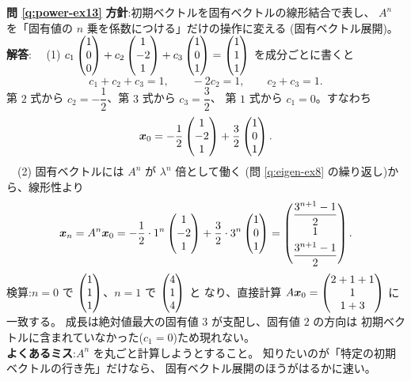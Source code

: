 \bigskip
\noindent\textbf{問 \ref{q:power-ex13}}\quad
\textbf{方針}:初期ベクトルを固有ベクトルの線形結合で表し、
$A^n$ を「固有値の $n$ 乗を係数につける」だけの操作に変える
(固有ベクトル展開)。\\
\textbf{解答}:
　(1) $c_1\begin{pmatrix}1 \\ 0 \\ 0\end{pmatrix} + c_2\begin{pmatrix}1 \\ -2 \\ 1\end{pmatrix}
+ c_3\begin{pmatrix}1 \\ 0 \\ 1\end{pmatrix} = \begin{pmatrix}1 \\ 1 \\ 1\end{pmatrix}$ を成分ごとに書くと
\[
c_1 + c_2 + c_3 = 1, \qquad -2c_2 = 1, \qquad c_2 + c_3 = 1.
\]
第 $2$ 式から $c_2 = -\dfrac{1}{2}$、第 $3$ 式から $c_3 = \dfrac{3}{2}$、
第 $1$ 式から $c_1 = 0$。すなわち
\[
\bm{x}_0 = -\frac{1}{2}\begin{pmatrix}1 \\ -2 \\ 1\end{pmatrix} + \frac{3}{2}\begin{pmatrix}1 \\ 0 \\ 1\end{pmatrix}.
\]
　(2) 固有ベクトルには $A^n$ が $\lambda^n$ 倍として働く
(問 \ref{q:eigen-ex8} の繰り返し)から、線形性より
\[
\bm{x}_n = A^n\bm{x}_0
= -\frac{1}{2} \cdot 1^n \begin{pmatrix}1 \\ -2 \\ 1\end{pmatrix}
+ \frac{3}{2} \cdot 3^n \begin{pmatrix}1 \\ 0 \\ 1\end{pmatrix}
= \begin{pmatrix}\dfrac{3^{n+1} - 1}{2} \\[1mm] 1 \\[1mm] \dfrac{3^{n+1} - 1}{2}\end{pmatrix}.
\]
検算:$n = 0$ で $\begin{pmatrix}1 \\ 1 \\ 1\end{pmatrix}$、$n = 1$ で $\begin{pmatrix}4 \\ 1 \\ 4\end{pmatrix}$ と
なり、直接計算 $A\bm{x}_0 = \begin{pmatrix}2 + 1 + 1 \\ 1 \\ 1 + 3\end{pmatrix}$ に一致する。
成長は絶対値最大の固有値 $3$ が支配し、固有値 $2$ の方向は
初期ベクトルに含まれていなかった($c_1 = 0$)ため現れない。\\
\textbf{よくあるミス}:$A^n$ を丸ごと計算しようとすること。
知りたいのが「特定の初期ベクトルの行き先」だけなら、
固有ベクトル展開のほうがはるかに速い。

